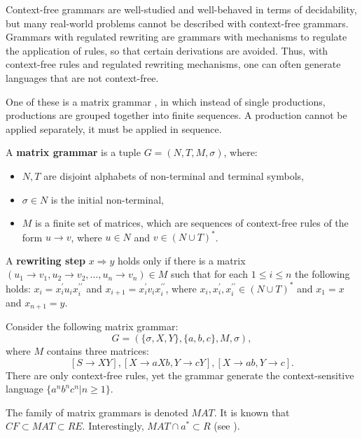 Context-free grammars are well-studied and well-behaved in terms of decidability, but many real-world problems cannot be described with context-free grammars. Grammars with regulated rewriting are grammars with mechanisms to regulate the application of rules, so that certain derivations are avoided. Thus, with context-free rules and regulated rewriting mechanisms, one can often generate languages that are not context-free.

One of these is a matrix grammar \cite{Dassow12RegulatedRewriting}, in which instead of single productions, productions are grouped together into finite sequences. A production cannot be applied separately, it must be applied in sequence.

\begin{definition}
A  {\bf matrix grammar} is a tuple $G = (N,T,M,\sigma)$, where:
\begin{itemize}
  \item $N, T$ are disjoint alphabets of non-terminal and terminal symbols,
  \item $\sigma\in N$ is the initial non-terminal,
  \item $M$ is a finite set of matrices, which are sequences of context-free rules of the form $u\rightarrow v$, where $u\in N$ and $v\in (N\cup T)^*$.
\end{itemize}
\end{definition}

\begin{definition}
A {\bf rewriting step} $x\Rightarrow y$ holds only if there is a matrix $(u_1\rightarrow v_1, u_2\rightarrow v_2, \ldots, u_n\rightarrow v_n) \in M$ such that for each $1\leq i\leq n$ the following holds: $x_i = x_i^{\prime}u_ix_i^{\prime\prime}$ and $x_{i+1} = x_i^{\prime}v_ix_i^{\prime\prime}$, where $x_i, x_i^{\prime}, x_i^{\prime\prime} \in (N\cup T)^*$ and $x_1 = x$ and $x_{n+1} = y$.
\end{definition}

\begin{example}
Consider the following matrix grammar: $$G=(\{\sigma, X,Y\}, \{ a,b,c\}, M, \sigma),$$ where $M$ contains three matrices: $$[S\rightarrow XY], [X\rightarrow aXb, Y\rightarrow cY], [X\rightarrow ab, Y\rightarrow c].$$ There are only context-free rules, yet the grammar generate the context-sensitive language $\{a^nb^nc^n|n\geq 1\}$.
\end{example}

The family of matrix grammars is denoted $MAT$. It is known that $CF \subset MAT \subset RE$. Interestingly, $MAT \cap {a}^* \subset R$ (see \cite{Besozzi:PhD:2004}).
